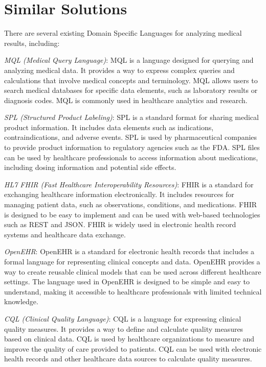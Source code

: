 \vspace{0.5cm}
\section{Similar Solutions}

There are several existing Domain Specific Languages for analyzing medical results, including:\par
\emph{MQL (Medical Query Language)}: MQL is a language designed for querying and analyzing medical data. It provides a way to express complex queries and calculations that involve medical concepts and terminology. MQL allows users to search medical databases for specific data elements, such as laboratory results or diagnosis codes. MQL is commonly used in healthcare analytics and research.

\emph{SPL (Structured Product Labeling)}: SPL is a standard format for sharing medical product information. It includes data elements such as indications, contraindications, and adverse events. SPL is used by pharmaceutical companies to provide product information to regulatory agencies such as the FDA. SPL files can be used by healthcare professionals to access information about medications, including dosing information and potential side effects.

\emph{HL7 FHIR (Fast Healthcare Interoperability Resources)}: FHIR is a standard for exchanging healthcare information electronically. It includes resources for managing patient data, such as observations, conditions, and medications. FHIR is designed to be easy to implement and can be used with web-based technologies such as REST and JSON. FHIR is widely used in electronic health record systems and healthcare data exchange.

\emph{OpenEHR}: OpenEHR is a standard for electronic health records that includes a formal language for representing clinical concepts and data. OpenEHR provides a way to create reusable clinical models that can be used across different healthcare settings. The language used in OpenEHR is designed to be simple and easy to understand, making it accessible to healthcare professionals with limited technical knowledge.

\emph{CQL (Clinical Quality Language)}: CQL is a language for expressing clinical quality measures. It provides a way to define and calculate quality measures based on clinical data. CQL is used by healthcare organizations to measure and improve the quality of care provided to patients. CQL can be used with electronic health records and other healthcare data sources to calculate quality measures.

